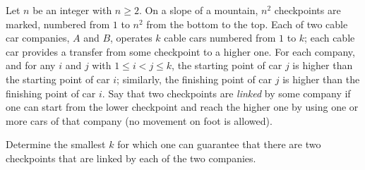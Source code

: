 Let $n$ be an integer with $n \geq 2$. On a slope of a mountain, $n^2$ checkpoints are marked, numbered from $1$ to $n^2$ from the bottom to the top. Each of two cable car companies, $A$ and $B$, operates $k$ cable cars numbered from $1$ to $k$; each cable car provides a transfer from some checkpoint to a higher one. For each company, and for any $i$ and $j$ with $1 \leqslant i < j \leqslant k$, the starting point of car $j$ is higher than the starting point of car $i$; similarly, the finishing point of car $j$ is higher than the finishing point of car $i$. Say that two checkpoints are \emph{linked} by some company if one can start from the lower checkpoint and reach the higher one by using one or more cars of that company (no movement on foot is allowed).

Determine the smallest $k$ for which one can guarantee that there are two checkpoints that are linked by each of the two companies.
